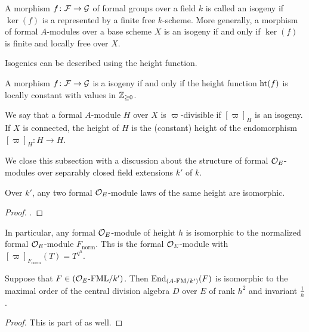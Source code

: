 \documentclass[../main.tex]{subfiles}
\begin{document}
\begin{defi}[Isogeny]
  A morphism $f\colon  \mathcal{F} \to \mathcal{G}$ of formal groups over a field $k$ is called an isogeny if
  $\ker(f)$ is a represented by a finite free $k$-scheme. More generally, a
  morphism of formal $A$-modules over a base scheme $X$ is an isogeny if and
  only if $\ker(f)$ is finite and locally free over $X$. 
\end{defi}

Isogenies can be described using the height function.

\begin{lem}
  A morphism $f\colon  \mathcal{F} \to \mathcal{G}$ is a isogeny if and only if the height 
  function $\textnormal{ht}(f)$ is locally constant with values in $\mathbb{Z}_{\geq 0}$. 
\end{lem}

\begin{defi}
  We say that a formal $A$-module $H$ over $X$ is $\varpi$-divisible if 
  $[\varpi]_H$ is an isogeny. If $X$ is connected, the height of $H$ is the
  (constant) height of the endomorphism $[\varpi]_H\colon  H \to H$. 
\end{defi}

We close this subsection with a discussion about the structure of 
formal $\mathcal{O}_E$-modules over separably closed field extensions $k'$ of
$k$. 
\begin{prop}\label{prop:classificationofmodulelawsbyheight}
  Over $k'$, any two formal $\mathcal{O}_E$-module laws of the same height are isomorphic.
\begin{proof}
  \cite[Proposition 1.7]{drinfel1974elliptic}.
\end{proof}
\end{prop}
In particular, any formal $\mathcal{O}_E$-module of height $h$ is isomorphic to 
the normalized formal $\mathcal{O}_E$-module $F_\mathrm{norm}$. Ths is the
formal $\mathcal{O}_E$-module with $[\varpi]_{F_\mathrm{norm}}(T) = T^{q^h}$. 
\begin{prop}\label{prop:EndomorphismsOfFormalModulesOverksep}
  Suppose that $F \in {({\mathcal{O}_E}\text-\allowbreak\mathrm{FML}/{k'})}$. Then $\operatorname{End}_{{({A}\text-\allowbreak\mathrm{FM}/{k'})}}(F)$ is 
  isomorphic to the maximal order
  of the central division algebra $D$ over $E$ of rank $h^2$ and invariant
  $\frac 1h$.
\begin{proof}
  This is part of \cite[Proposition 1.7]{drinfel1974elliptic}
  as well. 
\end{proof}
\end{prop}
\end{document}
